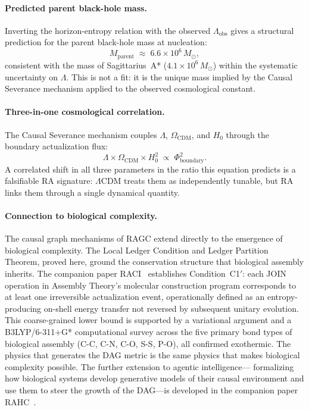 \documentclass[11pt,a4paper]{article}
\theoremstyle{plain}
\theoremstyle{definition}
\theoremstyle{remark}
\begin{document}
\paragraph{Predicted parent black-hole mass.}
Inverting the horizon-entropy relation with the observed $\Lambda_{\mathrm{obs}}$
gives a structural prediction for the parent black-hole mass at nucleation:
\begin{equation}
  M_{\mathrm{parent}} \;\approx\; 6.6 \times 10^6\,M_\odot,
  \label{eq:SMBH_parent}
\end{equation}
consistent with the mass of Sagittarius~A* ($4.1\times 10^6\,M_\odot$)
within the systematic uncertainty on $\Lambda$.  This is not a fit: it is
the unique mass implied by the Causal Severance mechanism applied to the
observed cosmological constant.

\paragraph{Three-in-one cosmological correlation.}
The Causal Severance mechanism couples $\Lambda$, $\Omega_{\mathrm{CDM}}$,
and $H_0$ through the boundary actualization flux:
\begin{equation}
  \Lambda \times \Omega_{\mathrm{CDM}} \times H_0^2
  \;\propto\; \Phi_{\mathrm{boundary}}^2.
  \label{eq:three_in_one}
\end{equation}
A correlated shift in all three parameters in the ratio this equation
predicts is a falsifiable RA signature: $\Lambda$CDM treats them as
independently tunable, but RA links them through a single dynamical quantity.

\paragraph{Connection to biological complexity.}
The causal graph mechanisms of RAGC extend directly to the emergence of biological
complexity. The Local Ledger Condition and Ledger Partition Theorem, proved here,
ground the conservation structure that biological assembly inherits. The companion
paper RACI~\citep{Sandeman2026c} establishes Condition~C1$'$: each JOIN operation
in Assembly Theory's molecular construction program corresponds to at least one
irreversible actualization event, operationally defined as an entropy-producing
on-shell energy transfer not reversed by subsequent unitary evolution. This
coarse-grained lower bound is supported by a variational argument and a
B3LYP/6-311+G* computational survey across the five primary bond types of
biological assembly (C-C, C-N, C-O, S-S, P-O), all confirmed exothermic.
The physics that generates the DAG metric is the same physics that makes
biological complexity possible. The further extension to agentic intelligence---
formalizing how biological systems develop generative models of their causal
environment and use them to steer the growth of the DAG---is developed in the
companion paper RAHC~\citep{Sandeman2026RAHC}.
\end{document}
